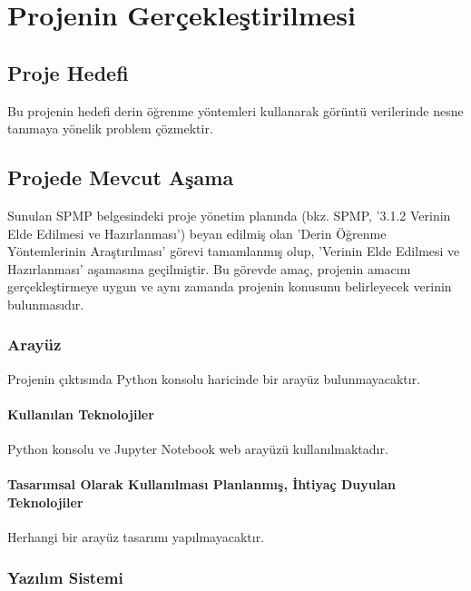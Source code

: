 \documentclass[12pt,a4paper]{article}
\begin{document}
    
    \newpage

    \tableofcontents
    \newpage


    \section{Projenin Gerçekleştirilmesi}
    \subsection{Proje Hedefi}
    Bu projenin hedefi derin öğrenme yöntemleri kullanarak görüntü verilerinde nesne tanımaya yönelik problem çözmektir.

    \subsection{Projede Mevcut Aşama}
    Sunulan SPMP belgesindeki proje yönetim planında (bkz. SPMP, '3.1.2 Verinin Elde Edilmesi ve Hazırlanması') beyan edilmiş olan 
    'Derin Öğrenme Yöntemlerinin Araştırılması' görevi tamamlanmış
    olup, 'Verinin Elde Edilmesi ve Hazırlanması' aşamasına geçilmiştir. Bu görevde amaç, projenin amacını gerçekleştirmeye uygun ve aynı zamanda projenin
    konusunu belirleyecek verinin bulunmasıdır.

    \subsubsection{Arayüz}
    Projenin çıktısında Python konsolu haricinde bir arayüz bulunmayacaktır.

    \paragraph{Kullanılan Teknolojiler}
    Python konsolu ve Jupyter Notebook web arayüzü kullanılmaktadır.

    \paragraph{Tasarımsal Olarak Kullanılması Planlanmış, İhtiyaç Duyulan Teknolojiler}
    Herhangi bir arayüz tasarımı yapılmayacaktır.
    
    \subsubsection{Yazılım Sistemi}
\end{document}
